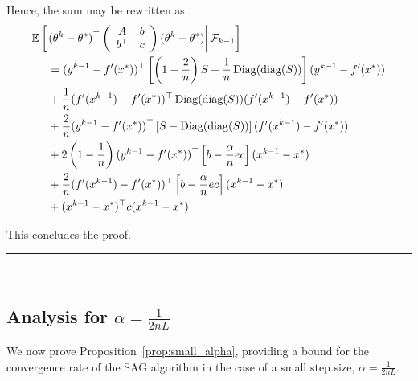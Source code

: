 \documentclass{article}
\newcommand{\diag}{\mathop{\rm diag}}
\newcommand{\Diag}{\mathop{\rm Diag}}
\newcommand{\BlackBox}{\rule{1.5ex}{1.5ex}}  %
\newenvironment{proof}{\par\noindent{\bf Proof\ }}{\hfill\BlackBox\\[2mm]}
\def\diag{\operatorname{diag}}
\def\E{_{\scriptscriptstyle E}}
\def \E{{\mathbb E}}
\def \E{{\mathbb E}}
\begin{document}
\begin{proof}
Hence, the sum may be rewritten as
\begin{align*}
&\E\left[\left.(\theta^k - \theta^*)^\top \left(\begin{array}{cc} A & b \\ b^\top & c
\end{array}\right) (\theta^k - \theta^*)\right| \mathcal{F}_{k-1}\right] \nonumber\\
&\hspace*{.5cm}=(y^{k-1} - f'(x^\ast))^\top \left[\left(1 - \frac{2}{n}\right)S + \frac{1}{n}\Diag(\diag(S))\right](y^{k-1} - f'(x^\ast))\\
&\hspace*{.5cm}+ \frac{1}{n}(f'(x^{k-1}) - f'(x^\ast))^\top \Diag(\diag(S))(f'(x^{k-1}) - f'(x^\ast))\\
&\hspace*{.5cm}+ \frac{2}{n}(y^{k-1} - f'(x^\ast))^\top \left[S - \Diag(\diag(S))\right] (f'(x^{k-1}) - f'(x^\ast))\\
&\hspace*{.5cm}+ 2\left(1 - \frac{1}{n}\right) (y^{k-1} - f'(x^\ast))^\top \left[b - \frac{\alpha}{n}ec\right](x^{k-1} - x^\ast)\\
&\hspace*{.5cm}+ \frac{2}{n}(f'(x^{k-1}) - f'(x^\ast))^\top\left[b - \frac{\alpha}{n}ec\right](x^{k-1} - x^\ast)\\
&\hspace*{.5cm}+ (x^{k-1} - x^\ast)^\top c (x^{k-1} - x^\ast)
\end{align*}

This concludes the proof.
\end{proof}

\subsection{Analysis for $\alpha = \frac{1}{2nL}$ }
We now prove Proposition~\ref{prop:small_alpha}, providing a bound for the convergence rate of the SAG algorithm in the case of a small step size, $\alpha = \frac{1}{2nL}$.
\end{document}
